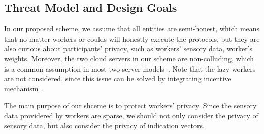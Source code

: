 \documentclass[conference]{IEEEtran}
\begin{document}
\subsection{Threat Model and Design Goals}

In our proposed scheme, we assume that all entities are semi-honest, which means that no matter workers or coulds will honestly execute the protocols, but they are also curious about participants' privacy, such as workers' sensory data, worker's weights.
Moreover, the two cloud servers in our scheme are non-colluding, which is a common assumption in most two-server models~\cite{zhang_lptd_2019,zhang_reliable_2019}.
Note that the lazy workers are not considered, since this issue can be solved by integrating incentive mechanism~\cite{xue_inpptd_2020}.

The main purpose of our shceme is to protect workers' privacy.
Since the sensory data providered by workers are sparse, we should not only consider the privacy of sensory data, but also consider the privacy of indication vectors.







\end{document}
